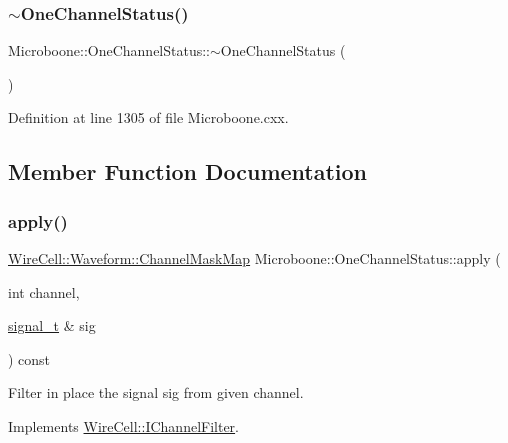 \subsubsection{\texorpdfstring{$\sim$\+One\+Channel\+Status()}{~OneChannelStatus()}}
{\footnotesize\ttfamily Microboone\+::\+One\+Channel\+Status\+::$\sim$\+One\+Channel\+Status (\begin{DoxyParamCaption}{ }\end{DoxyParamCaption})\hspace{0.3cm}{\ttfamily [virtual]}}



Definition at line 1305 of file Microboone.\+cxx.



\subsection{Member Function Documentation}
\mbox{\label{class_wire_cell_1_1_sig_proc_1_1_microboone_1_1_one_channel_status_af75669068bb7e6b9e618c887025c9fa3}} 
\subsubsection{\texorpdfstring{apply()}{apply()}\hspace{0.1cm}{\footnotesize\ttfamily [1/2]}}
{\footnotesize\ttfamily \hyperlink{namespace_wire_cell_1_1_waveform_a18b9ae61c858e340252ba3ac83ac3bc0}{Wire\+Cell\+::\+Waveform\+::\+Channel\+Mask\+Map} Microboone\+::\+One\+Channel\+Status\+::apply (\begin{DoxyParamCaption}\item[{int}]{channel,  }\item[{\hyperlink{class_wire_cell_1_1_i_channel_filter_a434ed96cc4b805fa0eeec14f9f8d85e9}{signal\+\_\+t} \&}]{sig }\end{DoxyParamCaption}) const\hspace{0.3cm}{\ttfamily [virtual]}}

Filter in place the signal {\ttfamily sig} from given {\ttfamily channel}. 

Implements \hyperlink{class_wire_cell_1_1_i_channel_filter_a6981186ee38a4b9b66e16c0d9b376b08}{Wire\+Cell\+::\+I\+Channel\+Filter}.



